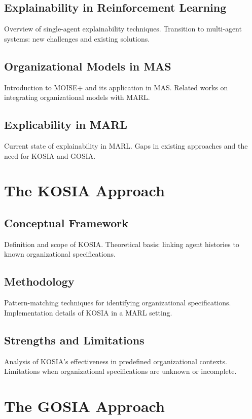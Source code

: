 \documentclass[sn-mathphys-num]{sn-jnl}%
\theoremstyle{thmstyleone}%
\theoremstyle{thmstyletwo}%
\theoremstyle{thmstylethree}%
\begin{document}
    \subsection{Explainability in Reinforcement Learning}
        Overview of single-agent explainability techniques. Transition to multi-agent systems: new challenges and existing solutions.
        
    \subsection{Organizational Models in MAS}
        Introduction to MOISE+ and its application in MAS. Related works on integrating organizational models with MARL.
        
    \subsection{Explicability in MARL}
        Current state of explainability in MARL. Gaps in existing approaches and the need for KOSIA and GOSIA.

\section{The KOSIA Approach}
\label{sec:kosia}
    \subsection{Conceptual Framework}
        Definition and scope of KOSIA. Theoretical basis: linking agent histories to known organizational specifications.
    
    \subsection{Methodology}
        Pattern-matching techniques for identifying organizational specifications. Implementation details of KOSIA in a MARL setting.
        
    \subsection{Strengths and Limitations}
        Analysis of KOSIA's effectiveness in predefined organizational contexts. Limitations when organizational specifications are unknown or incomplete.

\section{The GOSIA Approach}
\label{sec:gosia}
\end{document}
